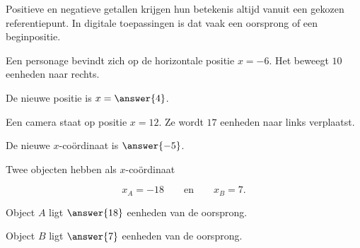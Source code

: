 \documentclass{ximera}
\begin{document}


Positieve en negatieve getallen krijgen hun betekenis altijd vanuit een
gekozen referentiepunt. In digitale toepassingen is dat vaak een oorsprong
of een beginpositie.


\begin{oefening}{\oefB\ESS}

Een personage bevindt zich op de horizontale positie \(x=-6\).
Het beweegt \(10\) eenheden naar rechts.

\begin{question}
De nieuwe positie is \(x=\answer{4}\).
\end{question}

\end{oefening}


\begin{oefening}{\oefB}

Een camera staat op positie \(x=12\).
Ze wordt \(17\) eenheden naar links verplaatst.

\begin{question}
De nieuwe \(x\)-coördinaat is \(\answer{-5}\).
\end{question}

\end{oefening}


\begin{oefening}{\oefB}

Twee objecten hebben als \(x\)-coördinaat

\[
x_A=-18
\qquad\text{en}\qquad
x_B=7.
\]

\begin{question}
Object \(A\) ligt \(\answer{18}\) eenheden van de oorsprong.
\end{question}

\begin{question}
Object \(B\) ligt \(\answer{7}\) eenheden van de oorsprong.
\end{question}

\end{oefening}
\end{document}
